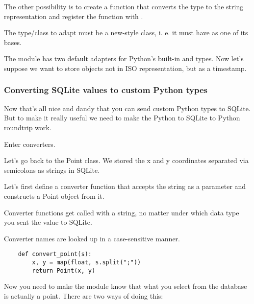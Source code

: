 The other possibility is to create a function that converts the type to the
string representation and register the function with .

    

\begin{notice}
The type/class to adapt must be a new-style class, i. e. it must have
 as one of its bases.
\end{notice}

The  module has two default adapters for Python's built-in
 and  types.  Now let's suppose
we want to store  objects not in ISO representation,
but as a \UNIX{} timestamp.

    

\subsubsection{Converting SQLite values to custom Python types}

Now that's all nice and dandy that you can send custom Python types to SQLite.
But to make it really useful we need to make the Python to SQLite to Python
roundtrip work.

Enter converters.

Let's go back to the Point class. We stored the x and y coordinates separated
via semicolons as strings in SQLite.

Let's first define a converter function that accepts the string as a parameter and constructs a Point object from it.

\begin{notice}
Converter functions  get called with a string, no matter
under which data type you sent the value to SQLite.
\end{notice}

\begin{notice}
Converter names are looked up in a case-sensitive manner.
\end{notice}


\begin{verbatim}
    def convert_point(s):
        x, y = map(float, s.split(";"))
        return Point(x, y)
\end{verbatim}

Now you need to make the  module know that what you select from the
database is actually a point. There are two ways of doing this:

